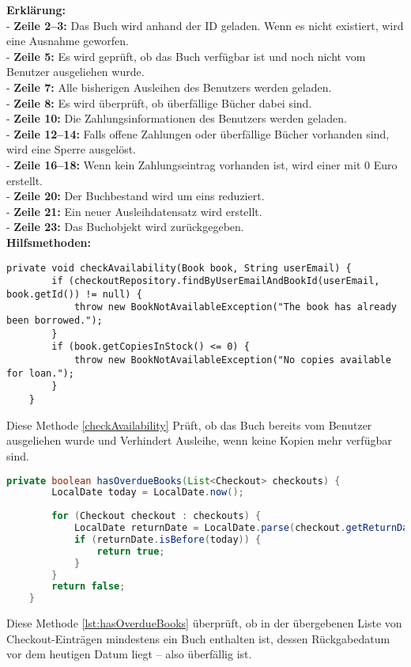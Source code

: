 \noindent \textbf{Erklärung:}\\
- \textbf{Zeile 2--3:} Das Buch wird anhand der ID geladen. Wenn es nicht existiert, wird eine Ausnahme geworfen. \\
- \textbf{Zeile 5:} Es wird geprüft, ob das Buch verfügbar ist und noch nicht vom Benutzer ausgeliehen wurde. \\
- \textbf{Zeile 7:} Alle bisherigen Ausleihen des Benutzers werden geladen. \\
- \textbf{Zeile 8:} Es wird überprüft, ob überfällige Bücher dabei sind.\\
- \textbf{Zeile 10:} Die Zahlungsinformationen des Benutzers werden geladen.\\
- \textbf{Zeile 12--14:} Falls offene Zahlungen oder überfällige Bücher vorhanden sind, wird eine Sperre ausgelöst.\\
- \textbf{Zeile 16--18:} Wenn kein Zahlungseintrag vorhanden ist, wird einer mit 0 Euro erstellt.\\
- \textbf{Zeile 20:} Der Buchbestand wird um eins reduziert.\\
- \textbf{Zeile 21:} Ein neuer Ausleihdatensatz wird erstellt.\\
- \textbf{Zeile 23:} Das Buchobjekt wird zurückgegeben.\\

\noindent \textbf{Hilfsmethoden:}
\begin{lstlisting}[style=pseudocode, caption=checkAvailability(), label=checkAvailability]
	private void checkAvailability(Book book, String userEmail) {
		if (checkoutRepository.findByUserEmailAndBookId(userEmail, book.getId()) != null) {
			throw new BookNotAvailableException("The book has already been borrowed.");
		}
		if (book.getCopiesInStock() <= 0) {
			throw new BookNotAvailableException("No copies available for loan.");
		}
	}
\end{lstlisting}
Diese Methode \ref{checkAvailability} Prüft, ob das Buch bereits vom Benutzer ausgeliehen wurde und Verhindert Ausleihe, wenn keine Kopien mehr verfügbar sind.

\begin{lstlisting}[language=Java, caption=hasOverdueBooks(), label=lst:hasOverdueBooks]
	private boolean hasOverdueBooks(List<Checkout> checkouts) {
		LocalDate today = LocalDate.now();
		
		for (Checkout checkout : checkouts) {
			LocalDate returnDate = LocalDate.parse(checkout.getReturnDate());
			if (returnDate.isBefore(today)) {
				return true;
			}
		}
		return false;
	}
\end{lstlisting}
Diese Methode  \ref{lst:hasOverdueBooks} überprüft, ob in der übergebenen Liste von Checkout-Einträgen mindestens ein Buch enthalten ist, dessen Rückgabedatum vor dem heutigen Datum liegt – also überfällig ist.

